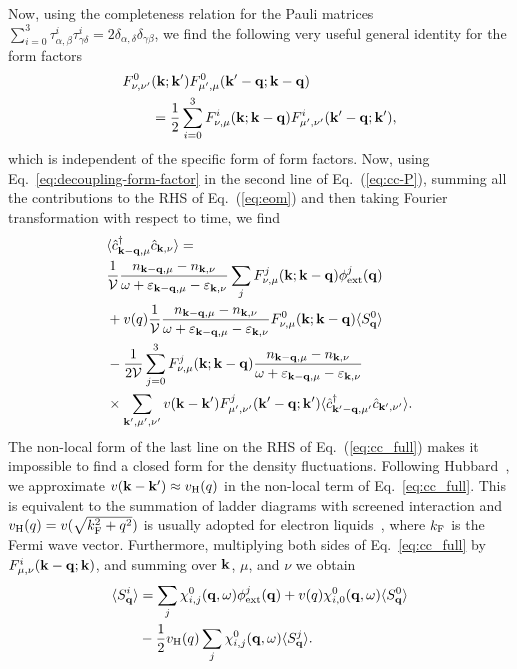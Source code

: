 \documentclass[aps, pra, reprint,superscriptaddress]{revtex4-1}
\def\be{\begin{equation}}
\def\ee{\end{equation}}
\def\kv{{\bf k}}
\def\qv{{\bf q}}
\def\Vc{{\cal V}}
\newcommand{\h}[1]{{\hat {#1}}}
\newcommand{\hdg}[1]{{\hat {#1}^\dagger}}
\begin{document}
Now, using the completeness relation for the Pauli matrices
$\sum_{i=0}^3 \tau^i_{\alpha,\beta}\tau^i_{\gamma\delta}=2 \delta_{\alpha,\delta}\delta_{\gamma\beta}$, 
 we find the following very useful general identity for the form factors
\be\label{eq:decoupling-form-factor}
\begin{split}
 F^{0}_{\nu,\nu'}&(\kv;\kv')  F^0_{\mu',\mu}(\kv'-\qv;\kv-\qv)
\\&=\frac{1}{2}\sum_{i=0}^3
 F^{i}_{\nu,\mu}(\kv;\kv-\qv) F^{i}_{\mu',\nu'}(\kv'-\qv;\kv'),
 \end{split}
\ee
which is independent of the specific form of form factors. Now, using Eq.~\eqref{eq:decoupling-form-factor} in the second line of Eq.~(\ref{eq:cc-P}),  
summing all the contributions to the RHS of Eq.~(\ref{eq:eom}) and then taking Fourier transformation with respect to time, we find
\be\label{eq:cc_full}
\begin{split}
&\langle\hdg{c}_{\kv-\qv,\mu} \h{c}_{\kv,\nu}\rangle=
\\
&\frac{1}{\Vc}\frac{n_{\kv-\qv,\mu}-n_{\kv,\nu}}{\omega +\varepsilon_{\kv-\qv,\mu}-\varepsilon_{\kv,\nu}}  \sum_j F^j_{\nu,\mu}(\kv;\kv-\qv) \phi^j_{\rm ext}(\qv)
 \\
&+v(q) \frac{1}{\Vc}\frac{n_{\kv-\qv,\mu}-n_{\kv,\nu}}{\omega +\varepsilon_{\kv-\qv,\mu}-\varepsilon_{\kv,\nu}}   F^{0}_{\nu,\mu}(\kv;\kv-\qv)\langle S^0_\qv \rangle
 \\
&-\frac{1}{2\Vc}\sum_{j=0}^3 F^{j}_{\nu,\mu}(\kv;\kv-\qv)
\frac{n_{\kv-\qv,\mu}-n_{\kv,\nu}}{\omega +\varepsilon_{\kv-\qv,\mu}-\varepsilon_{\kv,\nu}}
\\
&\times \sum_{\kv',\mu',\nu'} v(\kv-\kv')  F^{j}_{\mu',\nu'}(\kv'-\qv;\kv')  \langle\hdg{c}_{\kv'-\qv,\mu'} \h{c}_{\kv',\nu'}\rangle.
\end{split}
\end{equation}
The non-local form of the last line on the RHS of Eq.~(\ref{eq:cc_full}) makes it impossible to find a closed form for the density fluctuations. Following Hubbard~\cite{Hubbard_1957,GV_book,mahan_book}, we approximate $v(\kv-\kv') \approx v_{\rm H}(q)$ in the non-local term of Eq.~\eqref{eq:cc_full}. This is equivalent to the summation of ladder diagrams with screened interaction and $v_{\rm H}(q)=v(\sqrt{k_{\rm F}^2+q^2})$ is usually adopted for electron liquids~\cite{solyom_v3, GV_book}, where $k_{\rm F}$ is the Fermi wave vector.
Furthermore, multiplying both sides of Eq.~\eqref{eq:cc_full} by $F^{i}_{\mu,\nu}(\kv-\qv;\kv)$, and summing over $\kv$, $\mu$, and $\nu$ we obtain
\begin{equation}\label{RPA_H}
\begin{split}
\langle S^{i}_{\qv}\rangle&=
\sum_j\chi^{0}_{i,j}(\qv,\omega)\phi^j_{\rm ext}(\qv)+
v(q)\chi^{0}_{i,0}(\qv,\omega) \langle S^{0}_{\qv} \rangle
\\
&-\frac{1}{2}v_{\rm H}(q)\sum_j \chi^{0}_{i,j}(\qv,\omega) \langle S^j_\qv \rangle.
\end{split}
\end{equation}
\end{document}
